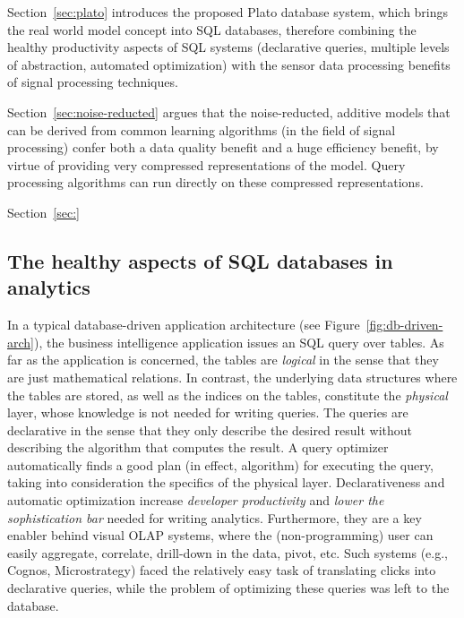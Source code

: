 Section~\ref{sec:plato} introduces the proposed Plato database system, which brings the real world model concept into SQL databases, therefore combining the healthy productivity aspects of SQL systems (declarative queries, multiple levels of abstraction, automated optimization) with the sensor data processing benefits of signal processing techniques.

Section~\ref{sec:noise-reducted} argues that the noise-reducted, additive models that can be derived from common learning algorithms (in the field of signal processing) confer both a data quality benefit and a huge efficiency benefit, by virtue of providing very compressed representations of the model. Query processing algorithms can run directly on these compressed representations.

Section~\ref{sec:}


\subsection{The healthy aspects of SQL databases in analytics}
\label{sec:healthy-aspects}
In a typical database-driven application architecture (see Figure~\ref{fig:db-driven-arch}), the business intelligence application issues an SQL query over tables. As far as the application is concerned, the tables are {\em logical} in the sense that they are just mathematical relations. In contrast, the underlying data structures where the tables are stored, as well as the indices on the tables, constitute the {\em physical} layer, whose knowledge is not needed for writing queries. The queries are declarative in the sense that they only describe the desired result without describing the algorithm that computes the result. A query optimizer automatically finds a good plan (in effect, algorithm) for executing the query, taking into consideration the specifics of the physical layer. Declarativeness and automatic optimization increase {\em developer productivity} and {\em lower the sophistication bar} needed for writing analytics. Furthermore, they are a key enabler behind visual OLAP systems, where the (non-programming) user can easily aggregate, correlate, drill-down in the data, pivot, etc. Such systems (e.g., Cognos, Microstrategy) faced the relatively easy task of translating clicks into declarative queries, while the problem of optimizing these queries was left to the database.


